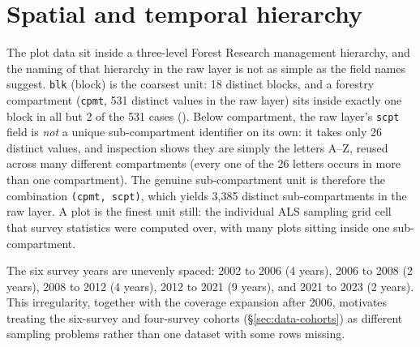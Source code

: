 
\section{Spatial and temporal hierarchy}
\label{sec:data-hierarchy}

The plot data sit inside a three-level Forest Research management hierarchy, and the naming of
that hierarchy in the raw layer is not as simple as the field names suggest. \texttt{blk} (block)
is the coarsest unit: 18 distinct blocks, and a forestry compartment (\texttt{cpmt}, 531 distinct
values in the raw layer) sits inside exactly one block in all but 2 of the 531 cases
(). Below compartment, the raw layer's \texttt{scpt} field is \emph{not} a unique
sub-compartment identifier on its own: it takes only 26 distinct values, and inspection shows they
are simply the letters A--Z, reused across many different compartments (every one of the 26
letters occurs in more than one compartment). The genuine sub-compartment unit is therefore the
combination \texttt{(cpmt, scpt)}, which yields 3,385 distinct sub-compartments in the raw layer.
A plot is the finest unit still: the individual ALS sampling grid cell that survey statistics were
computed over, with many plots sitting inside one sub-compartment.

The six survey years are unevenly spaced: 2002 to 2006 (4 years), 2006 to 2008 (2 years), 2008 to
2012 (4 years), 2012 to 2021 (9 years), and 2021 to 2023 (2 years). This irregularity, together
with the coverage expansion after 2006, motivates treating the six-survey and four-survey cohorts
(\S\ref{sec:data-cohorts}) as different sampling problems rather than one dataset with some rows
missing.

